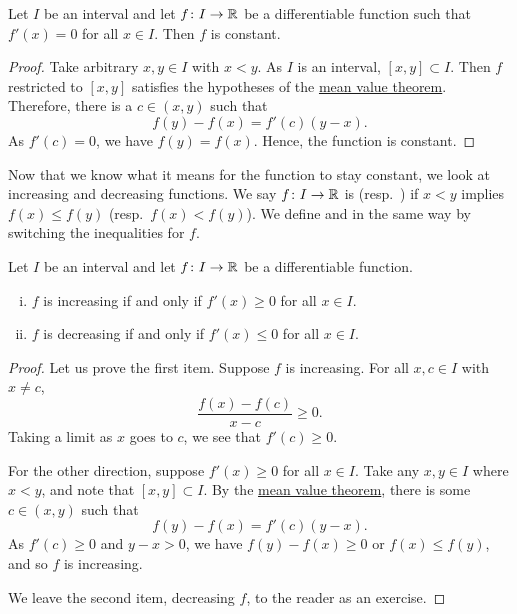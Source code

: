 \begin{prop} \label{prop:derzeroconst}
Let $I$ be an interval and
let $f \colon I \to {\mathbb{R}}$ be a differentiable function such that $f'(x) = 0$
for all $x \in I$.
Then $f$ is constant.
\end{prop}

\begin{proof}
Take arbitrary $x,y \in I$ with $x < y$.
As $I$ is an interval, $[x,y] \subset I$.
Then $f$ restricted to $[x,y]$ satisfies the hypotheses
of the \hyperref[thm:mvt]{mean value theorem}.
Therefore, there is a $c \in (x,y)$ such that
\begin{equation*}
f(y)-f(x) = f'(c)(y-x).
\end{equation*}
As $f'(c) = 0$, we have $f(y) = f(x)$.  Hence,
the function is constant.
\end{proof}

Now that we know what it means for the function to stay constant, we look
at increasing and decreasing functions.
We say $f \colon I \to {\mathbb{R}}$ is \emph{}
(resp.\  \emph{}) if
$x < y$ implies $f(x) \leq f(y)$ (resp.\ $f(x) < f(y)$).
We define
\emph{} and
\emph{} in the same way by switching the
inequalities for $f$.

\begin{prop} \label{incdecdiffprop}
Let $I$ be an interval and
let $f \colon I \to {\mathbb{R}}$ be a differentiable function.
\begin{enumerate}[(i)]
\item $f$ is increasing if and only if $f'(x) \geq 0$ for all $x \in I$.
\item $f$ is decreasing if and only if $f'(x) \leq 0$ for all $x \in I$.
\end{enumerate}
\end{prop}

\begin{proof}
Let us prove the first item.  Suppose $f$ is increasing.
For all $x,c \in I$ with $x \neq c$,
\begin{equation*}
\frac{f(x)-f(c)}{x-c} \geq 0 .
\end{equation*}
Taking a limit as $x$ goes to $c$, we see that $f'(c) \geq 0$.

For the other direction, suppose $f'(x) \geq 0$ for all $x \in I$.
Take any $x, y \in I$ where $x < y$, and note that $[x,y] \subset I$.
By the \hyperref[thm:mvt]{mean value theorem}, there is some $c \in (x,y)$ such that
\begin{equation*}
f(y)-f(x) = f'(c)(y-x) .
\end{equation*}
As $f'(c) \geq 0$ and $y-x > 0$, we have $f(y) - f(x) \geq 0$ or $f(x) \leq
f(y)$, and so
$f$ is increasing.

We leave the second item, decreasing $f$, to the reader as an exercise.
\end{proof}

